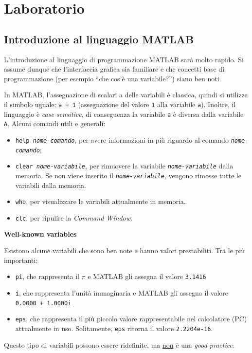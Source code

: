 \documentclass[a4paper]{article}
\newcommand{\dquotes}[1]{``#1''}
\newcommand{\highspace}{\vspace{1.2em}\noindent}
\begin{document}
    \section{Laboratorio}

    \subsection{Introduzione al linguaggio MATLAB}

    L'introduzione al linguaggio di programmazione MATLAB sarà molto rapido. Si assume dunque che l'interfaccia grafica sia familiare e che concetti base di programmazione (per esempio \dquotes{che cos'è una variabile?}) siano ben noti.

    \highspace
    In MATLAB, l'assegnazione di scalari a delle variabili è classica, quindi si utilizza il simbolo uguale: \texttt{a = 1} (assegnazione del valore \texttt{1} alla variabile \texttt{a}). Inoltre, il linguaggio è \emph{case sensitive}, di conseguenza la variabile \texttt{a} è diversa dalla variabile \texttt{A}. Alcuni comandi utili e generali:
    \begin{itemize}
        \item \texttt{help \emph{nome-comando}}, per avere informazioni in più riguardo al comando \texttt{\emph{nome-comando}};

        \item \texttt{clear \emph{nome-variabile}}, per rimuovere la variabile \texttt{\emph{nome-variabile}} dalla memoria. Se non viene inserito il \texttt{\emph{nome-variabile}}, vengono rimosse tutte le variabili dalla memoria.

        \item \texttt{who}, per visualizzare le variabili attualmente in memoria.

        \item \texttt{clc}, per ripulire la \emph{Command Window}.
    \end{itemize}

    \begin{flushleft}
        \large
        \textcolor{Red3}{\textbf{Well-known variables}}
    \end{flushleft}
    Esistono alcune variabili che sono ben note e hanno valori prestabiliti. Tra le più importanti:
    \begin{itemize}
        \item \texttt{pi}, che rappresenta il $\pi$ e MATLAB gli assegna il valore \texttt{3.1416}
        
        \item \texttt{i}, che rappresenta l'unità immaginaria e MATLAB gli assegna il valore \texttt{0.0000 + 1.0000i}
        
        \item \texttt{eps}, che rappresenta il più piccolo valore rappresentabile nel calcolatore (PC) attualmente in uso. Solitamente, \texttt{eps} ritorna il valore \texttt{2.2204e-16}.
    \end{itemize}
    Questo tipo di variabili possono essere ridefinite, ma \underline{non} è una \emph{good practice}.
\end{document}
